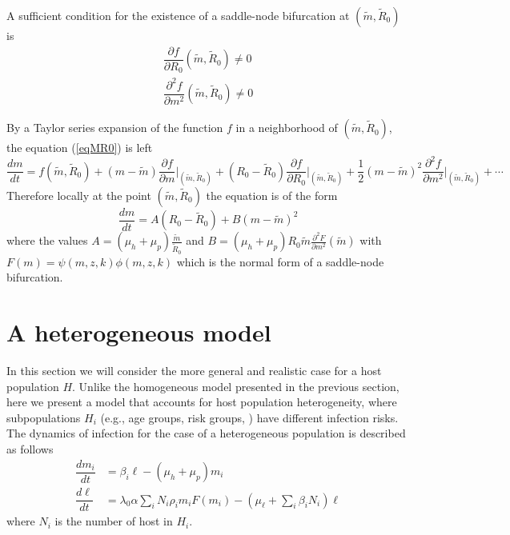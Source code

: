 \documentclass[12pt,a4paper]{article}
\theoremstyle{plain}%
\theoremstyle{definition}
\theoremstyle{remark}
\begin{document}
A sufficient condition for the existence of a saddle-node bifurcation at $(\tilde m,\tilde R_0)$ is
\begin{equation}
\begin{split}
\dfrac{\partial f }{\partial R_0}(\tilde m,\tilde R_0)\neq0\\
\dfrac{\partial^2 f }{\partial m^2}(\tilde m,\tilde R_0)\neq0
\end{split}
\end{equation}

By a Taylor series expansion of the function $f$ in a neighborhood of $(\tilde m,\tilde R_0)$, the equation (\ref{eqMR0}) is left
\begin{equation}
{\scriptstyle	
	\frac{dm}{dt}=f(\tilde m,\tilde R_0)+(m-\tilde m)\frac{\partial f }{\partial m}\big\vert_{(\tilde m,\tilde R_0)}%
	+(R_0-\tilde R_0){\frac{\partial f }{\partial R_0}\big\vert_{(\tilde m,\tilde R_0)}}%
	+{\frac {1}{2}}(m-\tilde m)^2{\frac{\partial^2 f }{\partial m^2}}\big\vert_{(\tilde m,\tilde R_0)}%
	+\cdots 
}
\end{equation}
Therefore locally at the point $(\tilde m,\tilde R_0)$ the equation is of the form
\begin{equation}
\dfrac{dm}{dt}=A(R_0-\tilde R_0)+B(m-\tilde m)^2
\end{equation}
where the values $A=(\mu_h +\mu_p)\frac{\tilde m}{\tilde R_0}$ and $B=(\mu_h + \mu_p) R_0 \tilde m \frac{\partial^2 F}{\partial m^2}(\tilde m)$ with $F(m)= \psi(m,z,k)\phi(m,z, k)$
which is the normal form of a saddle-node bifurcation.


\section{A heterogeneous model}
In this section we will consider the more general and realistic case for a host population $H$. Unlike the homogeneous model presented in the previous section, here we present a model that accounts for host population heterogeneity, where subpopulations $H_i$ (e.g., age groups, risk groups, \cite{anderson1992infectious,anderson2014coverage,truscott2014modeling}) have different infection risks. The dynamics of infection for the case of a heterogeneous population is described as follows
\begin{equation}\label{model2}
	\begin{split}
		\dfrac{dm_i}{dt}&=\beta_i \ell - (\mu_h+\mu_p) m_i\\
		\dfrac{d\ell}{dt}&= 
		\lambda_0 \alpha
		\sum_i  N_i \rho_i  m_i F(m_i)   - (\mu_{\ell}+\sum_i \beta_i N_i ) \ell 
	\end{split}
\end{equation} 
where $N_{i}$ is the number of host in $H_i$.
\end{document}
